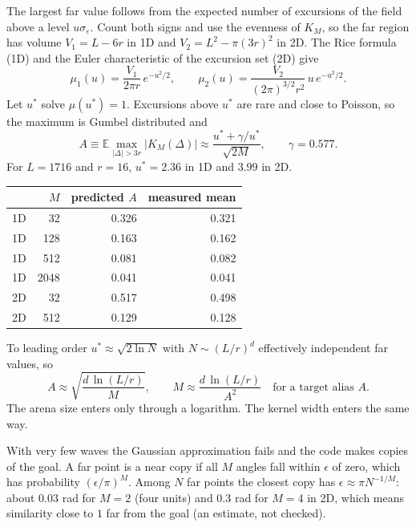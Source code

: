 \documentclass[11pt]{article}
\newcommand{\E}{\mathbb{E}}
\begin{document}
The largest far value follows from the expected number of excursions of the field above a level
$u\sigma_\varepsilon$. Count both signs and use the evenness of $K_M$, so the far region has volume
$V_1 = L - 6r$ in 1D and $V_2 = L^2 - \pi(3r)^2$ in 2D. The Rice formula (1D) and the Euler
characteristic of the excursion set (2D) give
\begin{equation}
  \mu_1(u) = \frac{V_1}{2\pi r}\,e^{-u^2/2}, \qquad
  \mu_2(u) = \frac{V_2}{(2\pi)^{3/2} r^2}\,u\,e^{-u^2/2} .
\end{equation}
Let $u^*$ solve $\mu(u^*) = 1$. Excursions above $u^*$ are rare and close to Poisson, so the
maximum is Gumbel distributed and
\begin{equation}
  A \equiv \E\max_{|\Delta| > 3r}|K_M(\Delta)| \approx \frac{u^* + \gamma/u^*}{\sqrt{2M}},
  \qquad \gamma = 0.577 .
  \label{eq:alias}
\end{equation}
For $L = 1716$ and $r = 16$, $u^* = 2.36$ in 1D and $3.99$ in 2D.

\begin{center}
\begin{tabular}{lrrr}
  \toprule
  & $M$ & predicted $A$ & measured mean \\
  \midrule
  1D & 32 & 0.326 & 0.321 \\
  1D & 128 & 0.163 & 0.162 \\
  1D & 512 & 0.081 & 0.082 \\
  1D & 2048 & 0.041 & 0.041 \\
  2D & 32 & 0.517 & 0.498 \\
  2D & 512 & 0.129 & 0.128 \\
  \bottomrule
\end{tabular}
\end{center}

\noindent To leading order $u^* \approx \sqrt{2\ln N}$ with $N \sim (L/r)^d$ effectively independent
far values, so
\begin{equation}
  A \approx \sqrt{\frac{d\,\ln(L/r)}{M}}, \qquad
  M \approx \frac{d\,\ln(L/r)}{A^2} \quad\text{for a target alias } A .
\end{equation}
The arena size enters only through a logarithm. The kernel width enters the same way.

With very few waves the Gaussian approximation fails and the code makes copies of the goal. A far
point is a near copy if all $M$ angles fall within $\epsilon$ of zero, which has probability
$(\epsilon/\pi)^M$. Among $N$ far points the closest copy has $\epsilon \approx \pi N^{-1/M}$: about
$0.03$ rad for $M = 2$ (four units) and $0.3$ rad for $M = 4$ in 2D, which means similarity close
to $1$ far from the goal (an estimate, not checked).
\end{document}
